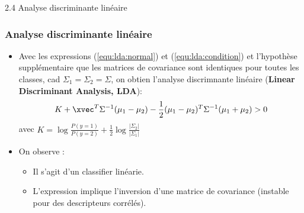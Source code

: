 \begin{frame}{2.4 Analyse discriminante linéaire}
\frametitle{Analyse discriminante linéaire}
\begin{itemize}
\item Avec les expressions (\ref{equ:lda:normal}) et (\ref{equ:lda:condition}) et l'hypothèse supplémentaire que les matrices de covariance sont identiques pour toutes les classes, cad
$\Sigma_1 = \Sigma_2 = \Sigma$, on obtien l'analyse discrimnante linéaire ({\bf Linear Discriminant Analysis, LDA}):
\begin{equation*}
K + \xvec^T\Sigma^{-1}(\mu_1-\mu_2) - \frac{1}{2}(\mu_1-\mu_2)^T\Sigma^{-1}(\mu_1+\mu_2) > 0
\end{equation*}
avec $K=\log{\frac{P(y=1)}{P(y=2)}} + \frac{1}{2}\log{\frac{|\Sigma_2|}{|\Sigma_1|}}$
\item On observe : 
\begin{itemize}
  \item Il s'agit d'un classifier linéarie. 
  \item L'expression implique l'inversion d'une matrice de covariance (instable pour des descripteurs corrélés). 
\end{itemize} 
\end{itemize} 
\end{frame}





